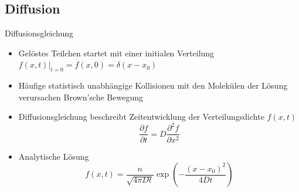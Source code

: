 \documentclass[]{beamer}
\begin{document}
\subsection{Diffusion}
\begin{frame}{Diffusionsgleichung}
	\begin{itemize}
		\item Gelöstes Teilchen startet mit einer initialen Verteilung $f(x,t)|_{t=0} = f(x,0) = \delta(x-x_0)$
		\item Häufige statistisch unabhängige Kollisionen mit den Molekülen der Lösung verursachen Brown'sche Bewegung
		\item Diffusionsgleichung \cite{einstein_motion_1905} beschreibt Zeitentwicklung der Verteilungsdichte $f(x,t)$
		\begin{equation*}
			\frac{\partial f}{\partial t} = D \frac{\partial^2 f}{\partial x^2}
		\end{equation*}
		\item<+-> Analytische Lösung
		\begin{equation*}
			f(x,t) = \frac{n}{\sqrt{4\pi D t}} \exp\left({-\frac{(x-x_0)^2}{4Dt}}\right)
		\end{equation*}
	\end{itemize}
\end{frame}
		
\end{document}

